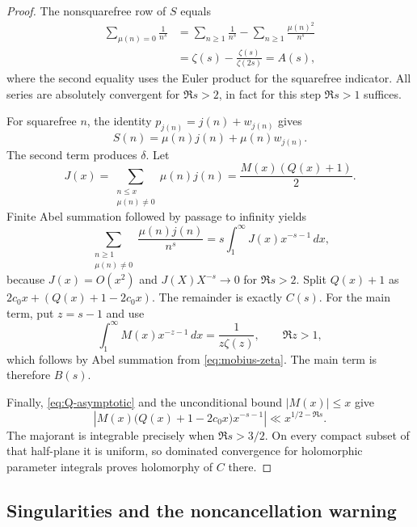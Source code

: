 \documentclass[11pt]{amsart}
\numberwithin{equation}{section}
\theoremstyle{plain}
\theoremstyle{definition}
\theoremstyle{remark}
\begin{document}
\begin{proof}
The nonsquarefree row of $S$ equals
\begin{align}
\sum_{\mu(n)=0}\frac1{n^s}
&=\sum_{n\ge1}\frac1{n^s}
-\sum_{n\ge1}\frac{\mu(n)^2}{n^s}
\label{eq:zero-row-first}\\
&=\zeta(s)-\frac{\zeta(s)}{\zeta(2s)}=A(s),
\label{eq:zero-row-second}
\end{align}
where the second equality uses the Euler product for the squarefree indicator.
All series are absolutely convergent for $\Re s>2$, in fact for this step
$\Re s>1$ suffices.

For squarefree $n$, the identity $p_{j(n)}=j(n)+w_{j(n)}$ gives
\begin{equation}
S(n)=\mu(n)j(n)+\mu(n)w_{j(n)}.
\label{eq:S-ordinal-residual}
\end{equation}
The second term produces $\delta$.  Let
\begin{equation}
J(x)=\sum_{\substack{n\le x\\ \mu(n)\ne0}}\mu(n)j(n)
=\frac{M(x)(Q(x)+1)}2.
\label{eq:J-definition}
\end{equation}
Finite Abel summation followed by passage to infinity yields
\begin{equation}
\sum_{\substack{n\ge1\\ \mu(n)\ne0}}
\frac{\mu(n)j(n)}{n^s}
=s\int_1^\infty J(x)x^{-s-1}\,dx,
\label{eq:J-Mellin}
\end{equation}
because $J(x)=O(x^2)$ and $J(X)X^{-s}\to0$ for $\Re s>2$.
Split $Q(x)+1$ as $2c_0x+(Q(x)+1-2c_0x)$.  The remainder is exactly
$C(s)$.  For the main term, put $z=s-1$ and use
\begin{equation}
\int_1^\infty M(x)x^{-z-1}\,dx
=\frac1{z\zeta(z)},\qquad \Re z>1,
\label{eq:M-mellin}
\end{equation}
which follows by Abel summation from \eqref{eq:mobius-zeta}.  The main term is
therefore $B(s)$.

Finally, \eqref{eq:Q-asymptotic} and the unconditional bound $|M(x)|\le x$
give
\begin{equation}
\left|M(x)\bigl(Q(x)+1-2c_0x\bigr)x^{-s-1}\right|
\ll x^{1/2-\Re s}.
\label{eq:C-majorant}
\end{equation}
The majorant is integrable precisely when $\Re s>3/2$.  On every compact
subset of that half-plane it is uniform, so dominated convergence for
holomorphic parameter integrals proves holomorphy of $C$ there.
\end{proof}

\subsection{Singularities and the noncancellation warning}
\label{subsec:singularities}
\end{document}
